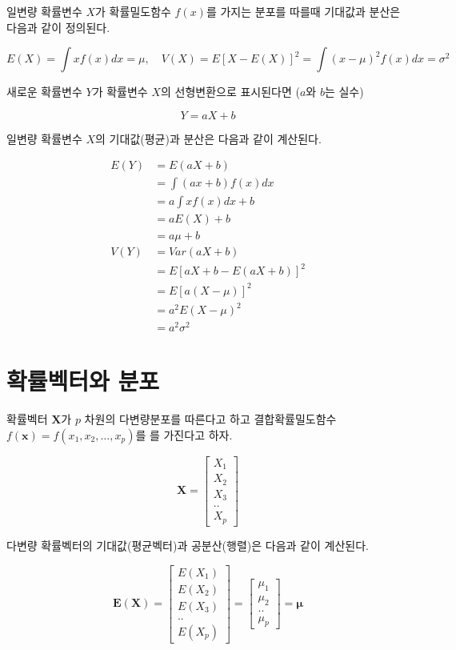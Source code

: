 \documentclass[
  11pt,
  a4paper,
  oneside]{scrbook}
\begin{document}
일변량 확률변수 \(X\)가 확률밀도함수 \(f(x)\)를 가지는 분포를 따를때
기대값과 분산은 다음과 같이 정의된다.

\[ E(X) = \int x f(x)  dx = \mu, \quad V(X) = E[ X-E(X)]^2=\int (x-\mu)^2 f(x) dx =\sigma^2 \]

새로운 확률변수 \(Y\)가 확률변수 \(X\)의 선형변환으로 표시된다면
(\(a\)와 \(b\)는 실수)

\[ Y = aX+b \]

일변량 확률변수 \(X\)의 기대값(평균)과 분산은 다음과 같이 계산된다.

\[
\begin{aligned}
E(Y) &= E(aX+b) \\
&= \int (ax+b) f(x) dx \\
&= a \int x f(x) dx + b \\
&= a E(X) + b\\
&= a \mu + b \\
V(Y) &= Var(aX+b) \\
&= E[aX+b -E(aX+b)]^2 \\
&= E[a(X-\mu)]^2 \\
&= a^2 E(X-\mu)^2\\
&= a^2 \sigma^2
\end{aligned}
\]

\section{확률벡터와
분포}\label{uxd655uxb960uxbca1uxd130uxc640-uxbd84uxd3ec}

확률벡터 \(\pmb X\)가 \(p\) 차원의 다변량분포를 따른다고 하고
결합확률밀도함수 \(f(\pmb x) =f(x_1,x_2,\dots,x_p)\)를 를 가진다고 하자.

\[
\pmb X =
  \begin{bmatrix}
X_1 \\
X_2 \\
X_3 \\
..  \\
X_p
\end{bmatrix}
\]

다변량 확률벡터의 기대값(평균벡터)과 공분산(행렬)은 다음과 같이
계산된다.

\[
\pmb E(\pmb X) =
  \begin{bmatrix}
E(X_1) \\
E(X_2) \\
E(X_3) \\
..  \\
E(X_p)
\end{bmatrix}
= 
  \begin{bmatrix}
\mu_1 \\
\mu_2 \\
..  \\
\mu_p
\end{bmatrix}
=\pmb \mu
\]
\end{document}
